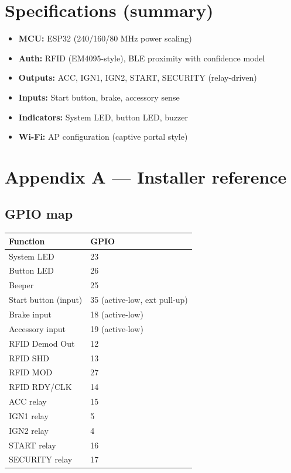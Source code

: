 \documentclass[11pt]{article}
\begin{document}
\section{Specifications (summary)}
\begin{itemize}
  \item \textbf{MCU:} ESP32 (240/160/80 MHz power scaling)
  \item \textbf{Auth:} RFID (EM4095-style), BLE proximity with confidence model
  \item \textbf{Outputs:} ACC, IGN1, IGN2, START, SECURITY (relay-driven)
  \item \textbf{Inputs:} Start button, brake, accessory sense
  \item \textbf{Indicators:} System LED, button LED, buzzer
  \item \textbf{Wi-Fi:} AP configuration (captive portal style)
\end{itemize}

\clearpage
\section*{Appendix A — Installer reference}
\subsection*{GPIO map}
\begin{tabularx}{\linewidth}{@{}l l@{}}
\toprule
\textbf{Function} & \textbf{GPIO}\\
\midrule
System LED           & 23 \\
Button LED           & 26 \\
Beeper               & 25 \\
Start button (input) & 35 (active-low, ext pull-up) \\
Brake input          & 18 (active-low) \\
Accessory input      & 19 (active-low) \\
RFID Demod Out       & 12 \\
RFID SHD             & 13 \\
RFID MOD             & 27 \\
RFID RDY/CLK         & 14 \\
ACC relay            & 15 \\
IGN1 relay           & 5 \\
IGN2 relay           & 4 \\
START relay          & 16 \\
SECURITY relay       & 17 \\
\bottomrule
\end{tabularx}
\end{document}
